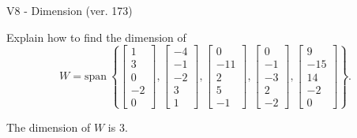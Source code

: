 \begin{exercise}
  \begin{exerciseTitle}V8 - Dimension (ver. 173)\end{exerciseTitle}
  \begin{exerciseStatement}
    Explain how to find the dimension of 
\[W=\mathrm{span}\ \left\{\left[\begin{array}{r}
1 \\
3 \\
0 \\
-2 \\
0
\end{array}\right] , \left[\begin{array}{r}
-4 \\
-1 \\
-2 \\
3 \\
1
\end{array}\right] , \left[\begin{array}{r}
0 \\
-11 \\
2 \\
5 \\
-1
\end{array}\right] , \left[\begin{array}{r}
0 \\
-1 \\
-3 \\
2 \\
-2
\end{array}\right] , \left[\begin{array}{r}
9 \\
-15 \\
14 \\
-2 \\
0
\end{array}\right]\right\}.\]



  \end{exerciseStatement}
  \begin{exerciseAnswer}
   The dimension of \(W\) is  \(3\).
  


  \end{exerciseAnswer}
\end{exercise}